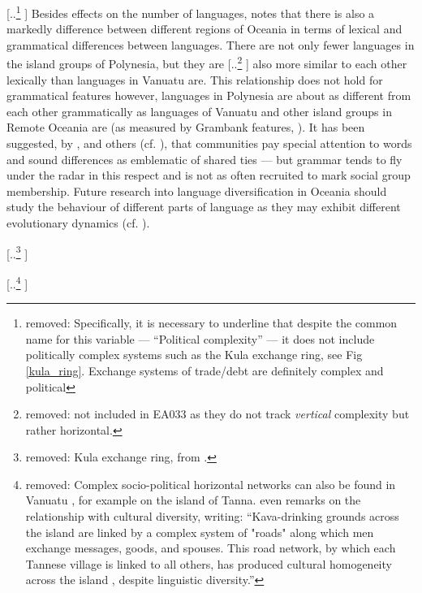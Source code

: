 \documentclass[unnumsec,webpdf,modern,medium]{oup-authoring-template}
\providecommand{\DIFaddtex}[1]{{\protect\color{blue} \sf #1}} %
\providecommand{\DIFdeltex}[1]{{\protect\color{red} [..\footnote{removed: #1} ]}} %
\providecommand{\DIFaddbegin}{} %
\providecommand{\DIFaddend}{} %
\providecommand{\DIFdelbegin}{} %
\providecommand{\DIFdelend}{} %
\providecommand{\DIFdelFL}[1]{\DIFdel{#1}} %
\providecommand{\DIFadd}[1]{\texorpdfstring{\DIFaddtex{#1}}{#1}} %
\providecommand{\DIFdel}[1]{\texorpdfstring{\DIFdeltex{#1}}{}} %
\newcommand{\DIFscaledelfig}{0.5}
\newlength{\DIFdelgraphicswidth} %
\newlength{\DIFdelgraphicsheight} %
\newcommand{\DIFaddincludegraphics}[2][]{{\color{blue}\fbox{\DIFOincludegraphics[#1]{#2}}}} %
\newcommand{\DIFdelincludegraphics}[2][]{%
\sbox{\DIFdelgraphicsbox}{\DIFOincludegraphics[#1]{#2}}%
\settoboxwidth{\DIFdelgraphicswidth}{\DIFdelgraphicsbox} %
\settoboxtotalheight{\DIFdelgraphicsheight}{\DIFdelgraphicsbox} %
\scalebox{\DIFscaledelfig}{%
\parbox[b]{\DIFdelgraphicswidth}{\usebox{\DIFdelgraphicsbox}\\[-\baselineskip] \rule{\DIFdelgraphicswidth}{0em}}\llap{\resizebox{\DIFdelgraphicswidth}{\DIFdelgraphicsheight}{%
\setlength{\unitlength}{\DIFdelgraphicswidth}%
\begin{picture}(1,1)%
\thicklines\linethickness{2pt} %
{\color[rgb]{1,0,0}\put(0,0){\framebox(1,1){}}}%
{\color[rgb]{1,0,0}\put(0,0){\line( 1,1){1}}}%
{\color[rgb]{1,0,0}\put(0,1){\line(1,-1){1}}}%
\end{picture}%
}\hspace*{3pt}}} %
} %
\DeclareRobustCommand{\DIFaddbegin}{\DIFOaddbegin \let\includegraphics\DIFaddincludegraphics} %
\DeclareRobustCommand{\DIFaddend}{\DIFOaddend \let\includegraphics\DIFOincludegraphics} %
\DeclareRobustCommand{\DIFdelbegin}{\DIFOdelbegin \let\includegraphics\DIFdelincludegraphics} %
\DeclareRobustCommand{\DIFdelend}{\DIFOaddend \let\includegraphics\DIFOincludegraphics} %
\begin{document}
\DIFdelbegin \DIFdel{Specifically, it is necessary to underline that despite the common name for this variable --- ``Political complexity'' --- it does not include politically complex systems such as the Kula exchange ring\citet{damon2002kula}, see Fig \ref{kula_ring}. Exchange systems of trade/debt are definitely complex and political}\DIFdelend \DIFaddbegin \DIFadd{Besides effects on the number of languages, \citet[218-291]{skirgaard2020multilevel} notes that there is also a markedly difference between different regions of Oceania in terms of lexical and grammatical differences between languages. There are not only fewer languages in the island groups of Polynesia}\DIFaddend , but they are \DIFdelbegin \DIFdel{not included in EA033 as they do not track \emph{vertical} complexity but rather horizontal.
}\DIFdelend \DIFaddbegin \DIFadd{also more similar to each other lexically than languages in Vanuatu are. This relationship does not hold for grammatical features however, languages in Polynesia are about as different from each other grammatically as languages of Vanuatu and other island groups in Remote Oceania are (as measured by Grambank features, \citep{grambank_release}). It has been suggested, by \citet{silverstein1981limits}, \citet{francois2011} and others (cf. \citet{mansfield2023dialect}), that communities pay special attention to words and sound differences as emblematic of shared ties --- but grammar tends to fly under the radar in this respect and is not as often recruited to mark social group membership. Future research into language diversification in Oceania should study the behaviour of different parts of language as they may exhibit different evolutionary dynamics (cf. \citet{greenhilletal_2017}).
}\DIFaddend 

\DIFdelbegin %
{%
\DIFdelFL{Kula exchange ring, from \citet{damon2002kula}.}}

\DIFdel{Complex socio-political horizontal networks can also be found in Vanuatu , for example on the island of Tanna. \citet[314]{lindstroem1991} even remarks on the relationship with cultural diversity, writing: ``Kava-drinking grounds across the island are linked by a complex system of "roads" along which men exchange messages, goods, and spouses. This road network, by which each Tannese village is linked to all others, has produced cultural homogeneity across the island , despite linguistic diversity.''
}%
\end{document}

